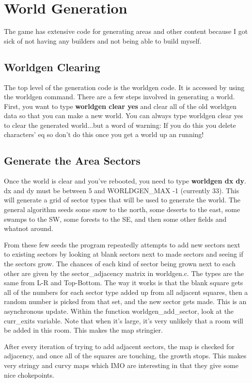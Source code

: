 \chapter{World Generation}

The game has extensive code for generating areas and other content because
I got sick of not having any builders and not being able to build myself.

\section{Worldgen Clearing}
The top level of the generation code is the worldgen code. It is accessed
by using the worldgen command. There are a few steps involved in generating
a world. First, you want to type {\bf{worldgen clear yes}} and clear all
of the old worldgen data so that you can make a new world. You can always
type worldgen clear yes to clear the generated world...but a word
of warning: If you do this you delete characters' eq so don't do this
once you get a world up an running! 


\section{Generate the Area Sectors}
Once the world is clear and you've rebooted, you need to type {\bf{worldgen
dx dy}}. dx and dy must be between 5 and WORLDGEN\_MAX -1 (currently 33). 
This will generate a grid of sector types that will be used to generate the
world. The general algorithm seeds some snow to the north, some 
deserts to the east, some swamps to the SW, some forests to the 
SE, and then some other fields and whatnot around. 

From these few seeds
the program repeatedly attempts to add new sectors next to existing
sectors by looking at blank sectors next to made sectors and
seeing if the sectors grow. The chances of each kind of sector 
being grown next to each other are given by the sector\_adjacency
matrix in worldgen.c. The types are the same from L-R and Top-Bottom.
The way it works is that the blank square gets all of the numbers for each
sector type added up from all adjacent squares, then a random number
is picked from that set, and the new sector gets made. This is an
asynchronous update. Within the function worldgen\_add\_sector,
look at the curr\_exits variable. Note that when it's large, it's
very unlikely that a room will be added in this room. This makes
the map stringier.

After every iteration of trying to add adjacent sectors, the map is 
checked for adjacency, and once all of the squares are touching, the
growth stops. This makes very stringy and curvy maps which IMO are 
interesting in that they give some nice chokepoints.

